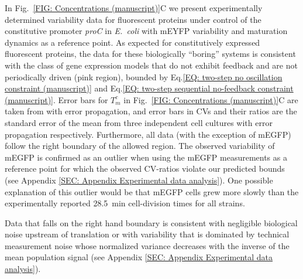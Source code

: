 \documentclass[%
 reprint,prx,
superscriptaddress,
%
%
%
%
%
%
%
%
%
 amsmath,amssymb,
 aps,
%
%
%
%
%
%
]{revtex4-2}
\begin{document}
{
In Fig.~\ref{FIG: Concentrations (manuscript)}C we present experimentally determined variability data \cite{Balleza2018} for fluorescent proteins under control of the constitutive promoter \emph{proC} in \emph{E.~coli} with mEYFP variability and maturation dynamics as a reference point. As expected for constitutively expressed fluorescent proteins, the data for these biologically ``boring'' systems is consistent with the class of gene expression models that do not exhibit feedback and are not periodically driven (pink region), bounded by Eq.\eqref{EQ: two-step no oscillation constraint (manuscript)} and Eq.\eqref{EQ: two-step sequential no-feedback constraint (manuscript)}.
%
%
Error bars for $T_{m}^{c}$ in Fig.~\ref{FIG: Concentrations (manuscript)}C are taken from \cite{Balleza2018} with error propagation, and error bars in CVs and their ratios are the standard error of the mean from three independent cell cultures with error propagation respectively. 
}
{
Furthermore, all data (with the exception of mEGFP) follow the right boundary of the allowed region. 
The observed variability  of mEGFP is confirmed as an outlier when using the mEGFP measurements as a reference point for which the observed CV-ratios violate our predicted bounds (see Appendix \ref{SEC: Appendix Experimental data analysis}). One possible explanation of this outlier would be that mEGFP cells grew more slowly than the experimentally reported \mbox{28.5 min} cell-division times for all strains.
%
}

{
Data that falls on the right hand boundary is consistent with negligible biological noise upstream of translation or with variability that is dominated by technical measurement noise whose normalized variance decreases with the inverse of the mean population signal (see Appendix \ref{SEC: Appendix Experimental data analysis}).}
\end{document}
